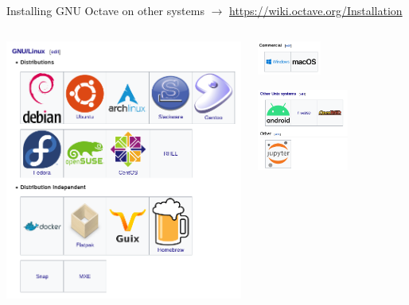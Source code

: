 \begin{frame}{Installing GNU Octave on other systems}
$\rightarrow$ \url{https://wiki.octave.org/Installation}
\bigskip
\begin{columns}
\begin{column}{0.4\textwidth}
\includegraphics[width=\textwidth]{res/images/octave_wiki_install_linux}
\end{column}
\begin{column}{0.4\textwidth}
\includegraphics[width=0.42\textwidth]{res/images/octave_wiki_install_commercial}

\includegraphics[width=0.6\textwidth]{res/images/octave_wiki_install_other}
\bigskip\bigskip\bigskip
\end{column}
\end{columns}

\end{frame}